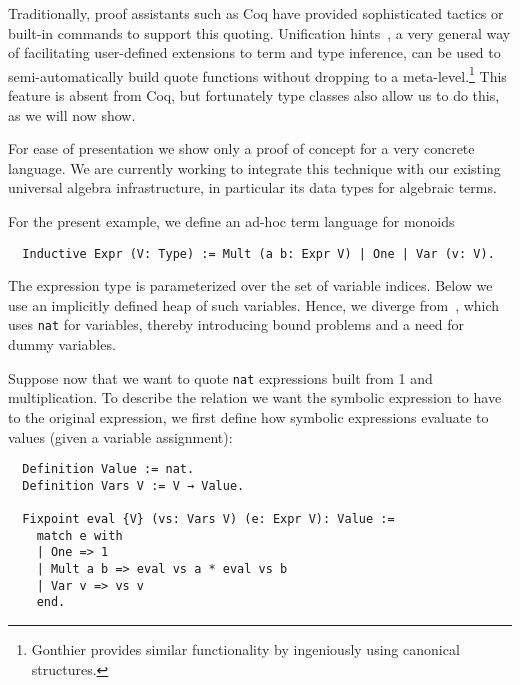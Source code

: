 \documentclass[a4paper,10pt,runningheads]{llncs}
\begin{document}
Traditionally, proof assistants such as Coq have provided sophisticated tactics or built-in commands to support this quoting. Unification hints~\cite{Hints}, a very general way of facilitating user-defined extensions to term and type inference, can be used to semi-automatically build quote functions without dropping to a meta-level.\footnote{Gonthier provides similar functionality by ingeniously using canonical structures.} This feature is absent from Coq, but fortunately type classes also allow us to do this, as we will now show.

For ease of presentation we show only a proof of concept for a very concrete language. We are currently working to integrate this technique with our existing universal algebra infrastructure, in particular its data types for algebraic terms.%

For the present example, we define an ad-hoc term language for monoids
\begin{lstlisting}
  Inductive Expr (V: Type) := Mult (a b: Expr V) | One | Var (v: V).
\end{lstlisting}
The expression type is parameterized over the set of variable indices. Below we use an implicitly defined heap of such variables. Hence, we diverge from~\cite{Hints}, which uses \lstinline|nat| for variables, thereby introducing bound problems and a need for dummy variables.

Suppose now that we want to quote \lstinline|nat| expressions built from 1 and multiplication. To describe the relation we want the symbolic expression to have to the original expression, we first define how symbolic expressions evaluate to values (given a variable assignment):
\begin{lstlisting}
  Definition Value := nat.
  Definition Vars V := V → Value.

  Fixpoint eval {V} (vs: Vars V) (e: Expr V): Value :=
    match e with
    | One => 1
    | Mult a b => eval vs a * eval vs b
    | Var v => vs v
    end.
\end{lstlisting}

\end{document}
